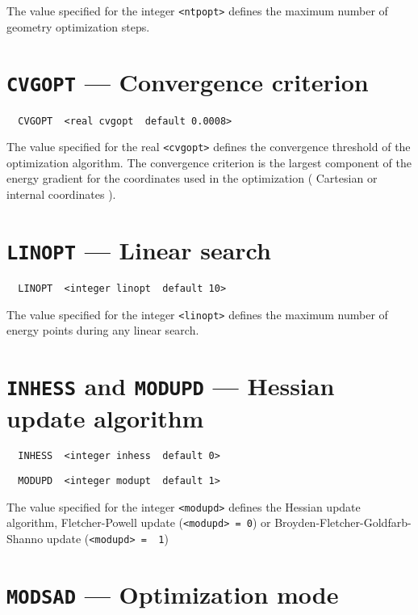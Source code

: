 The value specified for the integer \verb+<ntpopt>+ defines the maximum 
number of geometry optimization steps.  

\section{{\tt CVGOPT} --- Convergence criterion}

\begin{verbatim}
  CVGOPT  <real cvgopt  default 0.0008>
\end{verbatim}
 
The value specified for the real \verb+<cvgopt>+ defines the convergence
threshold of the optimization algorithm. The convergence criterion is
the largest component of the energy gradient for the coordinates used
in the optimization ( Cartesian or internal coordinates ).

\section{{\tt LINOPT} --- Linear search}

\begin{verbatim}
  LINOPT  <integer linopt  default 10>
\end{verbatim}

The value specified for the integer \verb+<linopt>+ defines the maximum 
number of energy points during any linear search. 

\section{{\tt INHESS} and {\tt MODUPD} --- Hessian update algorithm}

\begin{verbatim}
  INHESS  <integer inhess  default 0>
\end{verbatim}

\begin{verbatim}
  MODUPD  <integer modupt  default 1>
\end{verbatim}

The value specified for the integer \verb+<modupd>+ defines the Hessian 
update algorithm, Fletcher-Powell update (\verb+<modupd> = 0+) or
Broyden-Fletcher-Goldfarb-Shanno update (\verb+<modupd> =  1+)

\section{{\tt MODSAD} --- Optimization mode}

